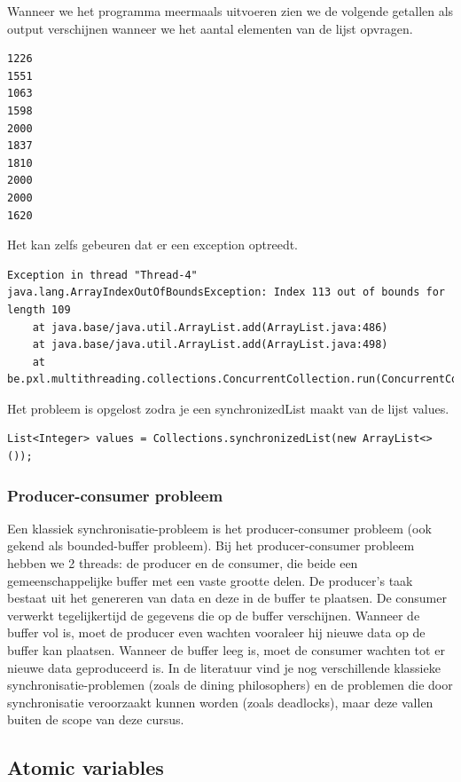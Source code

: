 Wanneer we het programma meermaals uitvoeren zien we de volgende getallen als output verschijnen wanneer we het aantal elementen van de lijst opvragen.

\begin{verbatim}
1226
1551
1063
1598
2000
1837
1810
2000
2000
1620
\end{verbatim}


Het kan zelfs gebeuren dat er een exception optreedt.
\begin{verbatim}
Exception in thread "Thread-4" java.lang.ArrayIndexOutOfBoundsException: Index 113 out of bounds for length 109
	at java.base/java.util.ArrayList.add(ArrayList.java:486)
	at java.base/java.util.ArrayList.add(ArrayList.java:498)
	at be.pxl.multithreading.collections.ConcurrentCollection.run(ConcurrentCollection.java:20)
\end{verbatim}

Het probleem is opgelost zodra je een synchronizedList maakt van de lijst values.

\begin{lstlisting}
List<Integer> values = Collections.synchronizedList(new ArrayList<>());
\end{lstlisting}

\subsubsection{Producer-consumer probleem}

Een klassiek synchronisatie-probleem is het producer-consumer probleem (ook gekend als bounded-buffer probleem). Bij het producer-consumer probleem hebben we 2 threads: de producer en de consumer, die beide een gemeenschappelijke buffer met een vaste grootte delen. De producer's taak bestaat uit het genereren van data en deze in de buffer te plaatsen. De consumer verwerkt tegelijkertijd de gegevens die op de buffer verschijnen. Wanneer de buffer vol is, moet de producer even wachten vooraleer hij nieuwe data op de buffer kan plaatsen. Wanneer de buffer leeg is, moet de consumer wachten tot er nieuwe data geproduceerd is.
In de literatuur vind je nog verschillende klassieke synchronisatie-problemen (zoals de dining philosophers) en de problemen die door synchronisatie veroorzaakt kunnen worden (zoals deadlocks), maar deze vallen buiten de scope van deze cursus.

\subsection{Atomic variables}

